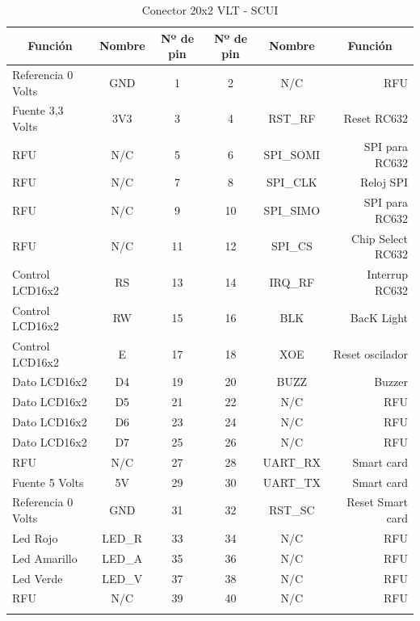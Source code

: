 \begin{longtable}{|l|c|c|c|c|r|}
\hline
\multicolumn{1}{|c|}{\textbf{Función}} & \textbf{Nombre} & \textbf{Nº de pin} & \textbf{Nº de pin} & \textbf{Nombre} & \multicolumn{1}{c|}{\textbf{Función}} \\ \hline
Referencia 0 Volts & GND & 1 & 2 & N/C & RFU \\ \hline
Fuente 3,3 Volts & 3V3 & 3 & 4 & RST\_RF & Reset RC632 \\ \hline
RFU & N/C & 5 & 6 & SPI\_SOMI & SPI para RC632 \\ \hline
RFU & N/C & 7 & 8 & SPI\_CLK & Reloj SPI \\ \hline
RFU & N/C & 9 & 10 & SPI\_SIMO & SPI para RC632 \\ \hline
RFU & N/C & 11 & 12 & SPI\_CS & Chip Select RC632 \\ \hline
Control LCD16x2 & RS & 13 & 14 & IRQ\_RF & Interrup RC632 \\ \hline
Control LCD16x2 & RW & 15 & 16 & BLK & BacK Light \\ \hline
Control LCD16x2 & E & 17 & 18 & XOE & Reset oscilador \\ \hline
Dato LCD16x2 & D4 & 19 & 20 & BUZZ & Buzzer \\ \hline
Dato LCD16x2 & D5 & 21 & 22 & N/C & RFU \\ \hline
Dato LCD16x2 & D6 & 23 & 24 & N/C & RFU \\ \hline
Dato LCD16x2 & D7 & 25 & 26 & N/C & RFU \\ \hline
RFU & N/C & 27 & 28 & UART\_RX & Smart card \\ \hline
Fuente 5 Volts & 5V & 29 & 30 & UART\_TX & Smart card \\ \hline
Referencia 0 Volts & GND & 31 & 32 & RST\_SC & Reset Smart card \\ \hline
Led Rojo & LED\_R & 33 & 34 & N/C & RFU \\ \hline
Led Amarillo & LED\_A & 35 & 36 & N/C & RFU \\ \hline
Led Verde & LED\_V & 37 & 38 & N/C & RFU \\ \hline
RFU & N/C & 39 & 40 & N/C & RFU \\ \hline
\caption{Conector 20x2 VLT - SCUI}
\label{}
\end{longtable}


